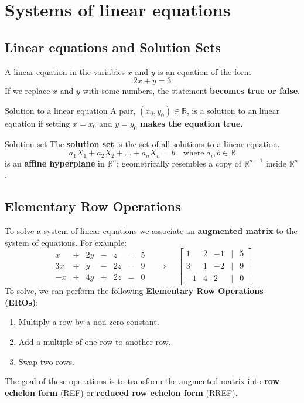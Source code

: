\documentclass[a4paper, 9pt]{extarticle}
\begin{document}
\section{Systems of linear equations}
\subsection{Linear equations and Solution Sets}
A linear equation in the variables $x$ and
$y$ is an equation of the form
\begin{equation*}
  2x + y = 3
\end{equation*}
If we replace $x$ and $y$ with some numbers, the statement \textbf{becomes true or false}.

\begin{definitionbox}{Solution to a linear equation}{}
  A pair, $(x_0, y_0) \in \mathbb{R}$, is a solution to an linear equation if setting $x = x_0$ and $y = y_0$ \textbf{makes the equation true.}
\end{definitionbox}

\begin{definitionbox}{Solution set}{}
  The \textbf{solution set} is the set of all solutions to a linear equation.
  $$a_1X_1 + a_2X_2 + \ldots + a_nX_n = b \quad \text{where} \; a_i, b \in \mathbb{R}$$
  is an \textbf{affine hyperplane} in $\mathbb{R}^n$; geometrically resembles a copy of $\mathbb{R}^{n-1}$ inside $\mathbb{R}^n$.
\end{definitionbox}
\subsection{Elementary Row Operations}
To solve a system of linear equations we associate an \textbf{augmented matrix} to the system of equations. For example:
$$
  \begin{array}
    {ccccccc}x & + & 2y & - & z  & = & 5 \\
    3x         & + & y  & - & 2z & = & 9 \\
    -x         & + & 4y & + & 2z & = & 0
  \end{array}
  \quad \Rightarrow \quad
  \begin{bmatrix}
    1  & 2 & -1 & | & 5 \\
    3  & 1 & -2 & | & 9 \\
    -1 & 4 & 2  & | & 0
  \end{bmatrix}
$$
To solve, we can perform the following \textbf{Elementary Row Operations (EROs)}:
\begin{enumerate}
  \item Multiply a row by a non-zero constant.
  \item Add a multiple of one row to another row.
  \item Swap two rows.
\end{enumerate}
The goal of these operations is to transform the augmented matrix into \textbf{row echelon form} (REF) or \textbf{reduced row echelon form} (RREF).
\end{document}
